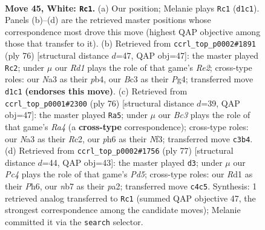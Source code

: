 \documentclass[11pt]{article}
\begin{document}
\clearpage

\begin{figure}[p]\centering
\begin{subfigure}{0.46\textwidth}\centering
\resizebox{\linewidth}{!}{%
\newchessgame
\chessboard[
  setfen={r7/pnr5/1p2p1kp/5p2/2P4R/N1B1P3/P4PP1/3R1K2 w - - 4 45},
  showmover=false,
  pgfstyle=straightmove, color=movearrow, markmove={d1-c1}
]}
\caption{}
\end{subfigure}\hfill
\begin{subfigure}{0.46\textwidth}\centering
\resizebox{\linewidth}{!}{%
\newchessgame
\chessboard[
  setfen={5rk1/3R1p2/p5pp/3P4/1p4PP/5P2/P3RK2/3r4 w - - 0 39},
  showmover=false,
  pgfstyle=straightmove, color=movearrow, markmove={e2-c2}
]}
\caption{}
\end{subfigure}
\\[4pt]
\begin{subfigure}{0.46\textwidth}\centering
\resizebox{\linewidth}{!}{%
\newchessgame
\chessboard[
  setfen={6k1/1pr4p/5bp1/1PP2p2/R7/1r3NP1/2R3KP/8 w - - 1 39},
  showmover=false,
  pgfstyle=straightmove, color=movearrow, markmove={a4-a5}
]}
\caption{}
\end{subfigure}\hfill
\begin{subfigure}{0.46\textwidth}\centering
\resizebox{\linewidth}{!}{%
\newchessgame
\chessboard[
  setfen={3r2k1/5p2/p3n1bp/8/1pPp2P1/1P4K1/P2R4/6BB b - - 2 39},
  showmover=false,
  pgfstyle=straightmove, color=movearrow, markmove={d4-d3}
]}
\caption{}
\end{subfigure}
\caption{\textbf{Move 45, White: \texttt{Rc1}.} (a) Our position; Melanie plays \texttt{Rc1} (\texttt{d1c1}). Panels (b)--(d) are the retrieved master positions whose correspondence most drove this move (highest QAP objective among those that transfer to it). (b) Retrieved from \texttt{ccrl\_top\_p0002\#1891} (ply 76) [structural distance $d$=47, QAP obj=47]: the master played \texttt{Rc2}; under $\mu$ our \emph{Rd1} plays the role of that game's \emph{Re2}; cross-type roles: our \emph{N}a3 as their \emph{p}b4, our \emph{B}c3 as their \emph{P}g4; transferred move \texttt{d1c1} \textbf{(endorses this move)}. (c) Retrieved from \texttt{ccrl\_top\_p0001\#2300} (ply 76) [structural distance $d$=39, QAP obj=47]: the master played \texttt{Ra5}; under $\mu$ our \emph{Bc3} plays the role of that game's \emph{Ra4} (a \textbf{cross-type} correspondence); cross-type roles: our \emph{N}a3 as their \emph{R}c2, our \emph{p}h6 as their \emph{N}f3; transferred move \texttt{c3b4}. (d) Retrieved from \texttt{ccrl\_top\_p0002\#1756} (ply 77) [structural distance $d$=44, QAP obj=43]: the master played \texttt{d3}; under $\mu$ our \emph{Pc4} plays the role of that game's \emph{Pd5}; cross-type roles: our \emph{R}d1 as their \emph{P}h6, our \emph{n}b7 as their \emph{p}a2; transferred move \texttt{c4c5}. Synthesis: 1 retrieved analog transferred to \texttt{Rc1} (summed QAP objective 47, the strongest correspondence among the candidate moves); Melanie committed it via the \texttt{search} selector.}
\label{fig:thought-m88}
\end{figure}
\end{document}
